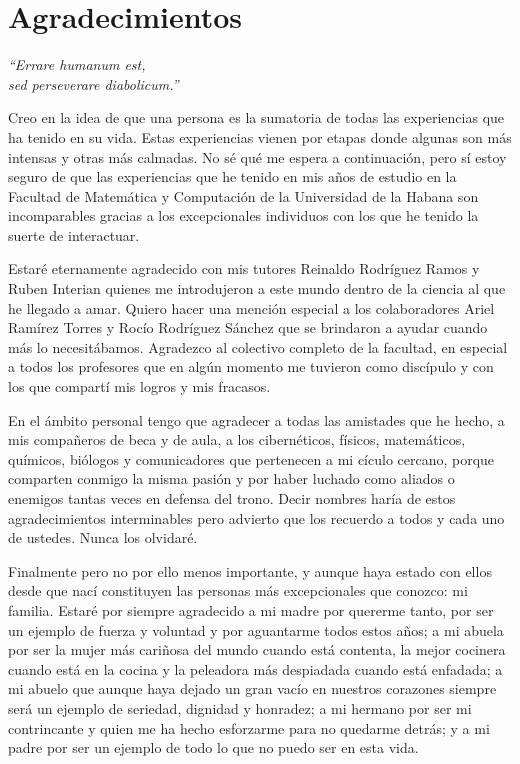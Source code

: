 \section*{Agradecimientos}

\begin{flushright}
\textit{``Errare humanum est,\\ sed perseverare diabolicum.''}
\end{flushright}

Creo en la idea de que una persona es la sumatoria de todas las experiencias que ha tenido en su vida. Estas experiencias vienen por etapas donde algunas son m\'as intensas y otras m\'as calmadas. No s\'e qu\'e me espera a continuaci\'on, pero s\'i estoy seguro de que las experiencias que he tenido en mis a\~nos de estudio en la Facultad de Matem\'atica y Computaci\'on de la Universidad de la Habana son incomparables gracias a los excepcionales individuos con los que he tenido la suerte de interactuar. 

Estar\'e eternamente agradecido con mis tutores Reinaldo Rodr\'iguez Ramos y Ruben Interian quienes me introdujeron a este mundo dentro de la ciencia al que he llegado a amar. Quiero hacer una menci\'on especial a los colaboradores Ariel Ram\'irez Torres y Roc\'io Rodr\'iguez S\'anchez que se brindaron a ayudar cuando m\'as lo necesit\'abamos. Agradezco al colectivo completo de la facultad, en especial a todos los profesores que en alg\'un momento me tuvieron como disc\'ipulo y con los que compart\'i mis logros y mis fracasos. 

En el \'ambito personal tengo que agradecer a todas las amistades que he hecho, a mis compa\~neros de beca y de aula, a los cibern\'eticos, f\'isicos, matem\'aticos, qu\'imicos, bi\'ologos y comunicadores que pertenecen a mi c\'iculo cercano, porque comparten conmigo la misma pasi\'on y por haber luchado como aliados o enemigos tantas veces en defensa del trono. Decir nombres har\'ia de estos agradecimientos interminables pero advierto que los recuerdo a todos y cada uno de ustedes. Nunca los olvidar\'e.

Finalmente pero no por ello menos importante, y aunque haya estado con ellos desde que nac\'i constituyen las personas m\'as excepcionales que conozco: mi familia. Estar\'e por siempre agradecido a mi madre por quererme tanto, por ser un ejemplo de fuerza y voluntad y por aguantarme todos estos a\~nos; a mi abuela por ser la mujer m\'as cari\~nosa del mundo cuando est\'a contenta, la mejor cocinera cuando est\'a en la cocina y la peleadora m\'as despiadada cuando est\'a enfadada; a mi abuelo que aunque haya dejado un gran vac\'io en nuestros corazones siempre ser\'a un ejemplo de seriedad, dignidad y honradez; a mi hermano por ser mi contrincante y quien me ha hecho esforzarme para no quedarme detr\'as; y a mi padre por ser un ejemplo de todo lo que no puedo ser en esta vida.